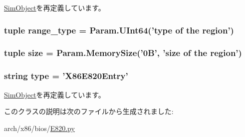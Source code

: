 \hyperlink{classm5_1_1SimObject_1_1SimObject_a17da7064bc5c518791f0c891eff05fda}{SimObject}を再定義しています。\hypertarget{classE820_1_1X86E820Entry_aac9d74b64a0733a055c83ee5ad93d13f}{
\subsubsection[{range\_\-type}]{\setlength{\rightskip}{0pt plus 5cm}tuple {\bf range\_\-type} = Param.UInt64('{\bf type} of the region')}}
\label{classE820_1_1X86E820Entry_aac9d74b64a0733a055c83ee5ad93d13f}
\hypertarget{classE820_1_1X86E820Entry_a377e5da8df1f89c5468c8b8cd07eac89}{
\subsubsection[{size}]{\setlength{\rightskip}{0pt plus 5cm}tuple {\bf size} = Param.MemorySize('0B', 'size of the region')}}
\label{classE820_1_1X86E820Entry_a377e5da8df1f89c5468c8b8cd07eac89}
\hypertarget{classE820_1_1X86E820Entry_acce15679d830831b0bbe8ebc2a60b2ca}{
\subsubsection[{type}]{\setlength{\rightskip}{0pt plus 5cm}string {\bf type} = '{\bf X86E820Entry}'}}
\label{classE820_1_1X86E820Entry_acce15679d830831b0bbe8ebc2a60b2ca}


\hyperlink{classm5_1_1SimObject_1_1SimObject_acce15679d830831b0bbe8ebc2a60b2ca}{SimObject}を再定義しています。

このクラスの説明は次のファイルから生成されました:\begin{DoxyCompactItemize}
\item 
arch/x86/bios/\hyperlink{E820_8py}{E820.py}\end{DoxyCompactItemize}
